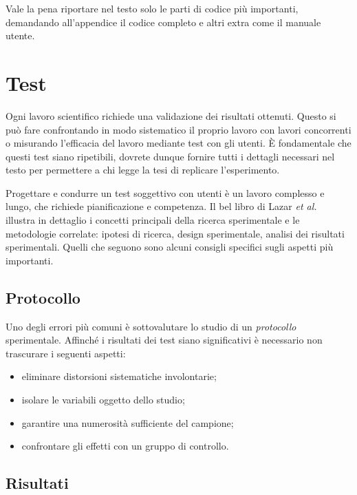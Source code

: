 \documentclass[12pt]{report}
\begin{document}
Vale la pena riportare nel testo solo le parti di codice più importanti, demandando all'appendice il codice completo e altri extra come il manuale utente.

%
%

\chapter{Test}
\label{chap:test}

Ogni lavoro scientifico richiede una validazione dei risultati ottenuti. Questo si può fare confrontando in modo sistematico il proprio lavoro con lavori concorrenti o misurando l'efficacia del lavoro mediante test con gli utenti. \`E fondamentale che questi test siano ripetibili, dovrete dunque fornire tutti i dettagli necessari nel testo per permettere a chi legge la tesi di replicare l'esperimento.

Progettare e condurre un test soggettivo con utenti \`e un lavoro complesso e lungo, che richiede pianificazione e competenza. Il bel libro di Lazar {\em et al.}~\cite{lazar2017methods} illustra in dettaglio i concetti principali della ricerca sperimentale e le metodologie correlate: ipotesi di ricerca, design sperimentale, analisi dei risultati sperimentali. Quelli che seguono sono alcuni consigli specifici sugli aspetti pi\`u importanti.

\section{Protocollo}

Uno degli errori più comuni è sottovalutare lo studio di un \textit{protocollo} sperimentale. Affinché i risultati dei test siano significativi è necessario non trascurare i seguenti aspetti:

\begin{itemize}
    \item eliminare distorsioni sistematiche involontarie;
    \item isolare le variabili oggetto dello studio;
    \item garantire una numerosità sufficiente del campione;
    \item confrontare gli effetti con un gruppo di controllo.
\end{itemize}

\section{Risultati}
\end{document}
